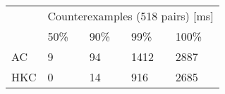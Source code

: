 \begin{tabular}{l|llll}
\multirow{2}{*}{} & \multicolumn{4}{c}{Counterexamples (518 pairs) {[}ms{]}} \\ \cline{2-5}
                  & 50\% & 90\%  & 99\%  & 100\%    \\ \hline
AC                & 9    & 94    & 1412  & 2887     \\
HKC               & 0    & 14    & 916   & 2685     \\
\end{tabular}
